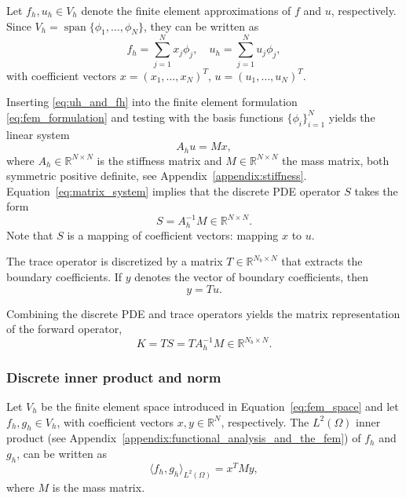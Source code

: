 Let $f_h, u_h \in V_h$ denote the finite element approximations of $f$ and $u$, respectively. Since $V_h = \operatorname{span}\{\phi_1,\dots,\phi_N\}$, they can be written as
\begin{equation}\label{eq:uh_and_fh}
    f_h = \sum_{j=1}^{N} x_j \phi_j, \quad
    u_h = \sum_{j=1}^{N} u_j \phi_j, 
\end{equation}
with coefficient vectors $x = (x_1,\dots,x_N)^T$, $u = (u_1,\dots,u_N)^T$.

Inserting \eqref{eq:uh_and_fh} into the finite element formulation \eqref{eq:fem_formulation} and testing with the basis functions 
$\{\phi_i\}_{i=1}^N$ yields the linear system
\begin{equation}\label{eq:matrix_system}
    A_h u = M x,
\end{equation}
where $A_h \in \mathbb{R}^{N \times N}$ is the stiffness matrix and $M \in \mathbb{R}^{N \times N}$ the mass matrix, both symmetric positive definite, see Appendix~\ref{appendix:stiffness}.
%
%
Equation~\eqref{eq:matrix_system} implies that the discrete PDE operator $S$ takes the form
\begin{equation*}
    S = A_h^{-1} M \in \mathbb{R}^{N \times N}.
\end{equation*}
Note that $S$ is a mapping of coefficient vectors: mapping $x$ to $u$.

The trace operator is discretized by a matrix 
$T \in \mathbb{R}^{N_b \times N}$ that extracts the boundary coefficients. If $y$ denotes the vector of boundary coefficients, then
\begin{equation*}
    y = T u.
\end{equation*}

Combining the discrete PDE and trace operators yields the matrix representation of the forward operator,
\begin{equation}\label{eq:discrete_K}
    K = T S = T A_h^{-1} M \in \mathbb{R}^{N_b \times N}.
\end{equation}
%


\subsubsection{Discrete inner product and norm}
Let $V_h$ be the finite element space introduced in Equation~\eqref{eq:fem_space} and let $f_h, g_h \in V_h$, with coefficient vectors $x, y \in \mathbb{R}^N$, respectively. The $L^2(\Omega)$ inner product (see Appendix~\ref{appendix:functional_analysis_and_the_fem}) of $f_h$ and $g_h$, can be written as
\begin{equation*}
    \langle f_h, g_h \rangle_{L^2(\Omega)} = x^T M y,
\end{equation*}
where $M$ is the mass matrix. 

